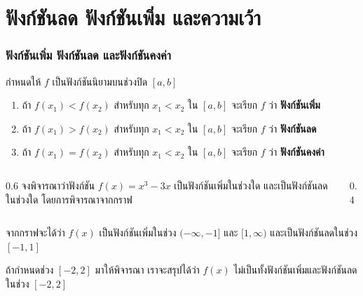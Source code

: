 \section{ฟังก์ชันลด ฟังก์ชันเพิ่ม และความเว้า}
\frame{\sectionpage}

\begin{frame}
\end{frame}

\begin{frame}
\frametitle{ฟังก์ชันเพิ่ม ฟังก์ชันลด และฟังก์ชันคงค่า}
\begin{defn}{}{}
กำหนดให้ $f$ เป็นฟังก์ชันนิยามบนช่วงปิด $[a,b]$ 
\begin{enumerate}
\item ถ้า $f(x_1) < f(x_2)$ สำหรับทุก $x_1 < x_2$ ใน $[a,b]$ \pa จะเรียก $f$ ว่า \textbf{ฟังก์ชันเพิ่ม} \pa
\item ถ้า $f(x_1) > f(x_2)$ สำหรับทุก $x_1 < x_2$ ใน $[a,b]$ \pa จะเรียก $f$ ว่า \textbf{ฟังก์ชันลด} \pa
\item ถ้า $f(x_1) = f(x_2)$ สำหรับทุก $x_1 < x_2$ ใน $[a,b]$ \pa จะเรียก $f$ ว่า \textbf{ฟังก์ชันคงค่า} \pa
\end{enumerate}
\end{defn}
\end{frame}

\begin{frame}
\end{frame}


\begin{frame}[t]
\begin{ex}
\begin{columns}
\begin{column}{0.6\textwidth}
จงพิจารณาว่าฟังก์ชัน $f(x) = x^3-3x$ เป็นฟังก์ชันเพิ่มในช่วงใด และเป็นฟังก์ชันลดในช่วงใด โดยการพิจารณาจากกราฟ
\end{column}
\begin{column}{0.4\textwidth}
\end{column}
\end{columns}
\end{ex}
\begin{sol}
จากกราฟจะได้ว่า $f(x)$ เป็นฟังก์ชันเพิ่มในช่วง $(-\infty, -1]$ และ $[1, \infty)$ และเป็นฟังก์ชันลดในช่วง $[-1,1]$

ถ้ากำหนดช่วง $[-2,2]$ มาให้พิจารณา เราจะสรุปได้ว่า $f(x)$ ไม่เป็นทั้งฟังก์ชันเพิ่มและฟังก์ชันลดในช่วง $[-2,2]$
\end{sol}
\end{frame}

